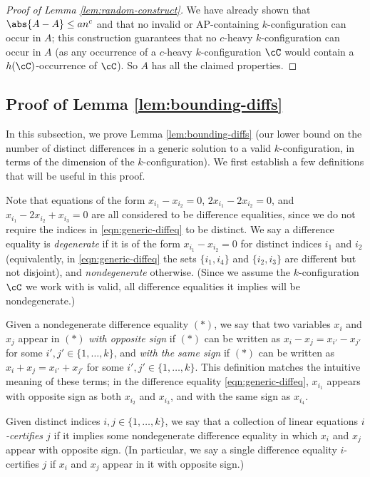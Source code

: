 \begin{proof}[Proof of Lemma \ref{lem:random-construct}]
    We have already shown that $\abs{A - A} \leq an^c$ and that no invalid or AP-containing $k$-configuration can occur in $A$; this construction guarantees that no $c$-heavy $k$-configuration can occur in $A$ (as any occurrence of a $c$-heavy $k$-configuration $\cC$ would contain a $h(\cC)$-occurrence of $\cC$). So $A$ has all the claimed properties. 
\end{proof}

\subsection{Proof of Lemma \ref{lem:bounding-diffs}} \label{subsec:bounding-diffs}

In this subsection, we prove Lemma \ref{lem:bounding-diffs} (our lower bound on the number of distinct differences in a generic solution to a valid $k$-configuration, in terms of the dimension of the $k$-configuration). We first establish a few definitions that will be useful in this proof. 

Note that equations of the form $x_{i_1} - x_{i_2} = 0$, $2x_{i_1} - 2x_{i_2} = 0$, and $x_{i_1} - 2x_{i_2} + x_{i_3} = 0$ are all considered to be difference equalities, since we do not require the indices in \eqref{eqn:generic-diffeq} to be distinct. We say a difference equality is \emph{degenerate} if it is of the form $x_{i_1} - x_{i_2} = 0$ for distinct indices $i_1$ and $i_2$ (equivalently, in \eqref{eqn:generic-diffeq} the sets $\{i_1, i_4\}$ and $\{i_2, i_3\}$ are different but not disjoint), and \emph{nondegenerate} otherwise. (Since we assume the $k$-configuration $\cC$ we work with is valid, all difference equalities it implies will be nondegenerate.)

Given a nondegenerate difference equality $(*)$, we say that two variables $x_i$ and $x_j$ appear in $(*)$ \emph{with opposite sign} if $(*)$ can be written as $x_i - x_j = x_{i'} - x_{j'}$ for some $i', j' \in \{1, \ldots, k\}$, and \emph{with the same sign} if $(*)$ can be written as $x_i + x_j = x_{i'} + x_{j'}$ for some $i', j' \in \{1, \ldots, k\}$. This definition matches the intuitive meaning of these terms; in the difference equality \eqref{eqn:generic-diffeq}, $x_{i_1}$ appears with opposite sign as both $x_{i_2}$ and $x_{i_3}$, and with the same sign as $x_{i_4}$. 

Given distinct indices $i, j \in \{1, \ldots, k\}$, we say that a collection of linear equations \emph{$i$-certifies $j$} if it implies some nondegenerate difference equality in which $x_i$ and $x_j$ appear with opposite sign. (In particular, we say a single difference equality $i$-certifies $j$ if $x_i$ and $x_j$ appear in it with opposite sign.) 

